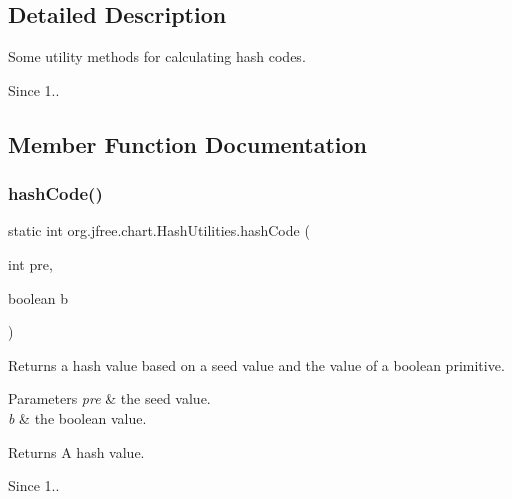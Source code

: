 \subsection{Detailed Description}
Some utility methods for calculating hash codes. ~\newline
 \begin{DoxySince}{Since}
1.. 
\end{DoxySince}


\subsection{Member Function Documentation}
\mbox{\label{classorg_1_1jfree_1_1chart_1_1_hash_utilities_aa24ce901adc9ad33cd04567ea5ffe5a5}} 
\subsubsection{\texorpdfstring{hash\+Code()}{hashCode()}\hspace{0.1cm}{\footnotesize\ttfamily [1/11]}}
{\footnotesize\ttfamily static int org.\+jfree.\+chart.\+Hash\+Utilities.\+hash\+Code (\begin{DoxyParamCaption}\item[{int}]{pre,  }\item[{boolean}]{b }\end{DoxyParamCaption})\hspace{0.3cm}{\ttfamily [static]}}

Returns a hash value based on a seed value and the value of a boolean primitive.


\begin{DoxyParams}{Parameters}
{\em pre} & the seed value. \\
\hline
{\em b} & the boolean value.\\
\hline
\end{DoxyParams}
\begin{DoxyReturn}{Returns}
A hash value.
\end{DoxyReturn}
\begin{DoxySince}{Since}
1.. 
\end{DoxySince}
\mbox{\label{classorg_1_1jfree_1_1chart_1_1_hash_utilities_ad50b1d78d0086f6908582a1f5ffab09a}} 
